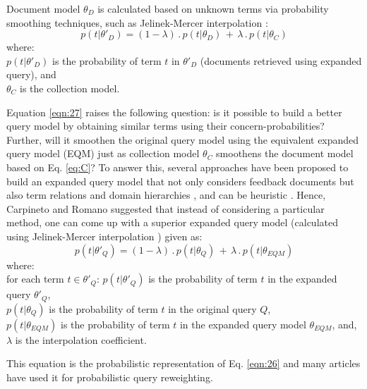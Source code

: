 Document model  $\theta_D$ is calculated based on unknown terms via probability smoothing techniques, such as Jelinek-Mercer interpolation \cite{jelinek1980interpolated,Jelinek1980}:
\begin{equation}\label{eq:C}
p(t|\theta'_D)=(1-\lambda)\,.\, p(t|\theta_D) \,+\, \lambda \,.\, p(t|\theta_{C})
\end{equation}
where:\\
$p(t|\theta'_D)$ is the probability of term $t$ in $\theta'_D$ (documents retrieved using expanded query), and \\
$\theta_{C}$ is the collection model.

Equation \ref{eqn:27} raises the following question: is it possible to build a better query model by obtaining similar terms using their concern-probabilities? Further, will it smoothen the original query model using the equivalent expanded query model (EQM) just as collection model $\theta_{C}$ smoothens the document model based on Eq. \ref{eq:C}? To answer this, several approaches have been proposed to  build an expanded query model that not only considers feedback documents \cite{zhai2001model,lavrenko2001relevance} but also term relations \cite{bai2005query,cao2007extending,gan2015improving} and domain hierarchies \cite{bai2007using}, and can be  heuristic \cite{shah2004evaluating}. Hence, Carpineto and Romano \cite{carpineto2012survey} suggested that instead of considering a particular method, one can come up with a superior expanded query model (calculated using Jelinek-Mercer interpolation \cite{Jelinek1980}) given as:
\begin{equation}
p(t|\theta'_Q)=(1-\lambda)\,.\, p(t|\theta_Q) \,+\, \lambda \,.\, p(t|\theta_{EQM})
\end{equation}
where:\\ 
for each term $t \in \theta'_Q$:
$p(t|\theta'_Q)$ is the probability of term $t$ in the expanded query $\theta'_Q$, \\
$p(t|\theta_Q)$ is the probability of term $t$ in the original query $Q$,\\
$p(t|\theta_{EQM})$ is the probability of term $t$ in the expanded query model $\theta_{EQM}$, and,\\
$\lambda$ is the interpolation coefficient.  

This equation is the probabilistic representation of Eq. \ref{eqn:26} and many articles \cite{xu2009query,kotov2012tapping,carpineto2012survey,gan2015improving,kuzi2016query,zhang2016learning} have used it for probabilistic query reweighting.

